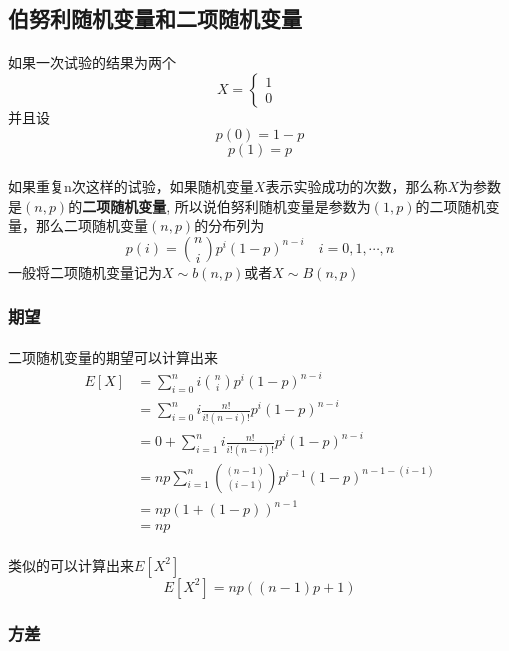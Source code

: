 \subsection{伯努利随机变量和二项随机变量}
\paragraph{}
如果一次试验的结果为两个
$$
X = \begin{cases}
1 & \quad  \\
0 & \quad 
\end{cases}
$$
并且设
$$
p(0) = 1 - p 
$$
$$
p(1) = p
$$

\paragraph{}
如果重复n次这样的试验，如果随机变量$X$表示实验成功的次数，那么称$X$为参数是$(n, p)$的\textbf{二项随机变量}, 所以说伯努利随机变量是参数为$(1, p)$的二项随机变量，那么二项随机变量$(n, p)$的分布列为
$$
p(i) = { n\choose i} p^i (1-p)^{n-i} \quad i = 0, 1, \cdots, n
$$
一般将二项随机变量记为$X \sim b(n, p)$或者$X \sim B(n, p)$

\subsubsection{期望}
\paragraph{}
二项随机变量的期望可以计算出来
\begin{align*}
E[X] &= \sum_{i=0}^n i {n\choose i} p^i (1-p)^{n-i} \\
		&= \sum_{i=0}^n i \frac{n!}{i! (n-i)!} p^i (1-p)^{n-i} \\
		&= 0 + \sum_{i=1}^n  i \frac{n!}{i! (n-i)!} p^i (1-p)^{n-i} \\
		&= np \sum_{i=1}^n {(n-1)\choose (i-1)} p^{i-1} (1-p)^{n-1-(i-1)} \\
		&= np (1 + (1-p))^{n-1} \\
		&= np
\end{align*}

\paragraph{}
类似的可以计算出来$E[X^2]$
$$
E[X^2] = np((n-1)p +1) 
$$


\subsubsection{方差}
